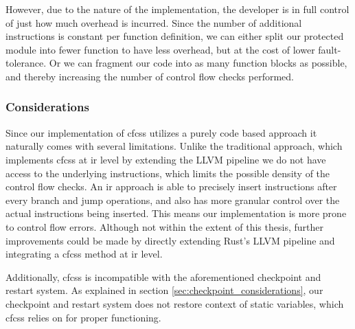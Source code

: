However, due to the nature of the implementation, the developer is in full control of just how much overhead is incurred. Since the number of additional instructions is constant per function definition, we can either split our protected module into fewer function to have less overhead, but at the cost of lower fault-tolerance. Or we can fragment our code into as many function blocks as possible, and thereby increasing the number of control flow checks performed.

\subsubsection{Considerations}

Since our implementation of \acrshort{cfcss} utilizes a purely code based approach it naturally comes with several limitations. Unlike the traditional approach, which implements \acrshort{cfcss} at \acrshort{ir} level by extending the LLVM pipeline we do not have access to the underlying instructions, which limits the possible density of the control flow checks. An \acrshort{ir} approach is able to precisely insert instructions after every branch and jump operations, and also has more granular control over the actual instructions being inserted. This means our implementation is more prone to control flow errors. Although not within the extent of this thesis, further improvements could be made by directly extending Rust's LLVM pipeline and integrating a \acrshort{cfcss} method at \acrshort{ir} level.

Additionally, \acrshort{cfcss} is incompatible with the aforementioned checkpoint and restart system. As explained in section \ref{sec:checkpoint_considerations}, our checkpoint and restart system does not restore context of static variables, which \acrshort{cfcss} relies on for proper functioning. 

